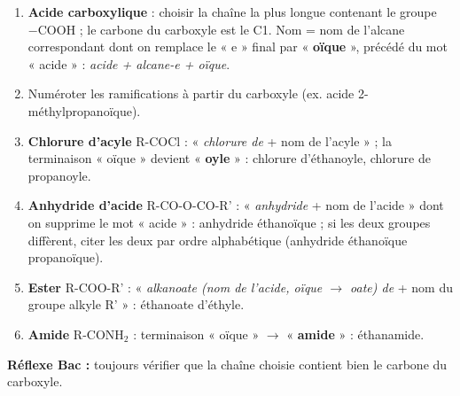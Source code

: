 \documentclass[11pt]{article}
\begin{document}
\begin{methode}
\begin{enumerate}
\item \textbf{Acide carboxylique} : choisir la chaîne la plus longue contenant le groupe $-\mathrm{COOH}$ ; le carbone du carboxyle est le C1. Nom = nom de l'alcane correspondant dont on remplace le « e » final par « \textbf{oïque} », précédé du mot « acide » : \emph{acide + alcane-e + oïque}.
\item Numéroter les ramifications à partir du carboxyle (ex. acide 2-méthylpropanoïque).
\item \textbf{Chlorure d'acyle} R-COCl : « \emph{chlorure de} + nom de l'acyle » ; la terminaison « oïque » devient « \textbf{oyle} » : chlorure d'éthanoyle, chlorure de propanoyle.
\item \textbf{Anhydride d'acide} R-CO-O-CO-R' : « \emph{anhydride} + nom de l'acide » dont on supprime le mot « acide » : anhydride éthanoïque ; si les deux groupes diffèrent, citer les deux par ordre alphabétique (anhydride éthanoïque propanoïque).
\item \textbf{Ester} R-COO-R' : « \emph{alkanoate (nom de l'acide, oïque $\to$ oate) de} + nom du groupe alkyle R' » : éthanoate d'éthyle.
\item \textbf{Amide} R-CONH$_2$ : terminaison « oïque » $\to$ « \textbf{amide} » : éthanamide.
\end{enumerate}
\textbf{Réflexe Bac :} toujours vérifier que la chaîne choisie contient bien le carbone du carboxyle.
\end{methode}
\end{document}
